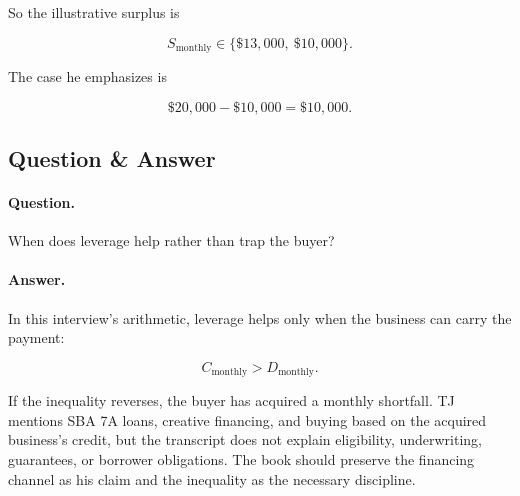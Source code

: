 \documentclass[11pt,oneside]{book}
\begin{document}
So the illustrative surplus is

\begin{equation}
S_{\mathrm{monthly}}
\in
\{\$13{,}000,\ \$10{,}000\}.
\end{equation}

The case he emphasizes is

\begin{equation}
\$20{,}000-\$10{,}000=\$10{,}000.
\end{equation}

\subsection{Question \& Answer}

\paragraph{Question.}
When does leverage help rather than trap the buyer?

\paragraph{Answer.}
In this interview's arithmetic, leverage helps only when the business can carry the payment:

\begin{equation}
C_{\mathrm{monthly}}>D_{\mathrm{monthly}}.
\end{equation}

If the inequality reverses, the buyer has acquired a monthly shortfall. TJ mentions SBA 7A loans, creative financing, and buying based on the acquired business's credit, but the transcript does not explain eligibility, underwriting, guarantees, or borrower obligations. The book should preserve the financing channel as his claim and the inequality as the necessary discipline.
\end{document}
